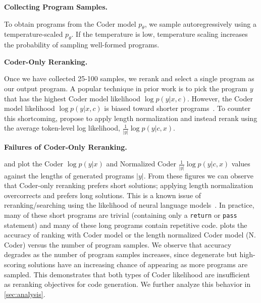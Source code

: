 \documentclass[nohyperref]{article}
\theoremstyle{plain}
\theoremstyle{definition}
\theoremstyle{remark}
\renewcommand{\paragraph}[1]{
     \textbf{#1} 
 }
\begin{document}
\paragraph{Collecting Program Samples.}
To obtain programs from the Coder model $p_{\theta}$, we sample autoregressively using a temperature-scaled $p_{\theta}$.
 If the temperature is low, temperature scaling increases the probability of sampling well-formed programs.

\paragraph{Coder-Only Reranking.}
Once we have collected 25-100 samples, we rerank and select a single program as our output program.
A popular technique in prior work \citep{codex} is to pick the program $y$ that has the highest Coder model likelihood $\log p(y|x, c)$.
However, the Coder model likelihood $\log p(y|x, c)$ is biased toward shorter programs~\citep{stahlberg2019nmt}.
To counter this shortcoming, \citet{codex} propose to apply length normalization and instead rerank using the average token-level log likelihood, $\frac{1}{\lvert y \rvert}\log p(y|c, x)$.

\paragraph{Failures of Coder-Only Reranking.}
 and  plot the Coder $\log p(y|x)$ and Normalized Coder $\frac{1}{\lvert y \rvert}\log p(y|c, x)$ values against the lengths of generated programs $\lvert y \rvert$.
From these figures we can observe that Coder-only reranking prefers short solutions; applying length normalization overcorrects and prefers long solutions.
This is a known issue of reranking/searching using the likelihood of neural language models~\citep{curious-case,stahlberg2019nmt}.
In practice, many of these short programs are trivial (\eg containing only a \texttt{return} or \texttt{pass} statement) and many of these long programs contain repetitive code.  plots the accuracy of ranking with Coder model or the length normalized Coder model (N. Coder) versus the number of program samples.
We observe that accuracy degrades as the number of program samples increases, since degenerate but high-scoring solutions have an increasing chance of appearing as more programs are sampled.
This demonstrates that both types of Coder likelihood are insufficient as reranking objectives for code generation.
We further analyze this behavior in \cref{sec:analysis}.
\end{document}
